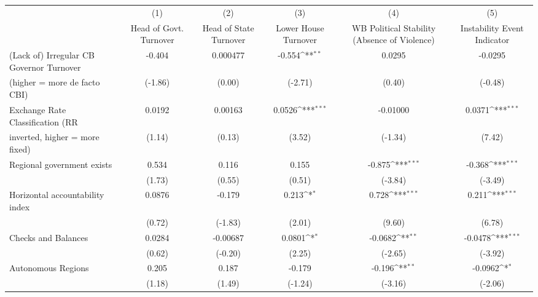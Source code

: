 {
\def\sym#1{\ifmmode^{#1}\else\(^{#1}\)\fi}
\begin{tabular}{l*{5}{c}}
\toprule
                                        &\multicolumn{1}{c}{(1)}&\multicolumn{1}{c}{(2)}&\multicolumn{1}{c}{(3)}&\multicolumn{1}{c}{(4)}&\multicolumn{1}{c}{(5)}\\
                                        &\multicolumn{1}{c}{Head of Govt. Turnover}&\multicolumn{1}{c}{Head of State Turnover}&\multicolumn{1}{c}{Lower House Turnover}&\multicolumn{1}{c}{WB Political Stability (Absence of Violence)}&\multicolumn{1}{c}{Instability Event Indicator}\\
\midrule
(Lack of) Irregular CB Governor Turnover&-0.404         &0.000477         &-0.554\sym{**} &0.0295         &-0.0295         \\
(higher = more de facto CBI)            &(-1.86)         &(0.00)         &(-2.71)         &(0.40)         &(-0.48)         \\
\addlinespace
Exchange Rate Classification (RR        &0.0192         &0.00163         &0.0526\sym{***}&-0.01000         &0.0371\sym{***}\\
inverted, higher = more fixed)          &(1.14)         &(0.13)         &(3.52)         &(-1.34)         &(7.42)         \\
\addlinespace
Regional government exists              &0.534         &0.116         &0.155         &-0.875\sym{***}&-0.368\sym{***}\\
                                        &(1.73)         &(0.55)         &(0.51)         &(-3.84)         &(-3.49)         \\
\addlinespace
Horizontal accountability index         &0.0876         &-0.179         &0.213\sym{*}  &0.728\sym{***}&0.211\sym{***}\\
                                        &(0.72)         &(-1.83)         &(2.01)         &(9.60)         &(6.78)         \\
\addlinespace
Checks and Balances                     &0.0284         &-0.00687         &0.0801\sym{*}  &-0.0682\sym{**} &-0.0478\sym{***}\\
                                        &(0.62)         &(-0.20)         &(2.25)         &(-2.65)         &(-3.92)         \\
\addlinespace
Autonomous Regions                      &0.205         &0.187         &-0.179         &-0.196\sym{**} &-0.0962\sym{*}  \\
                                        &(1.18)         &(1.49)         &(-1.24)         &(-3.16)         &(-2.06)         \\

\end{tabular}}
